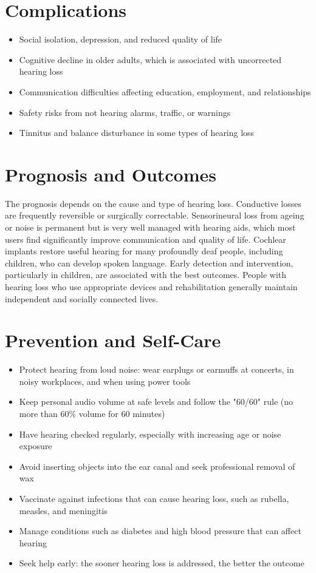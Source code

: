 \section*{Complications}
\begin{itemize}
    \item Social isolation, depression, and reduced quality of life
    \item Cognitive decline in older adults, which is associated with uncorrected hearing loss
    \item Communication difficulties affecting education, employment, and relationships
    \item Safety risks from not hearing alarms, traffic, or warnings
    \item Tinnitus and balance disturbance in some types of hearing loss
\end{itemize}

\section*{Prognosis and Outcomes}
The prognosis depends on the cause and type of hearing loss. Conductive losses are frequently reversible or surgically correctable. Sensorineural loss from ageing or noise is permanent but is very well managed with hearing aids, which most users find significantly improve communication and quality of life. Cochlear implants restore useful hearing for many profoundly deaf people, including children, who can develop spoken language. Early detection and intervention, particularly in children, are associated with the best outcomes. People with hearing loss who use appropriate devices and rehabilitation generally maintain independent and socially connected lives.

\section*{Prevention and Self-Care}
\begin{itemize}
    \item Protect hearing from loud noise: wear earplugs or earmuffs at concerts, in noisy workplaces, and when using power tools
    \item Keep personal audio volume at safe levels and follow the "60/60" rule (no more than 60\% volume for 60 minutes)
    \item Have hearing checked regularly, especially with increasing age or noise exposure
    \item Avoid inserting objects into the ear canal and seek professional removal of wax
    \item Vaccinate against infections that can cause hearing loss, such as rubella, measles, and meningitis
    \item Manage conditions such as diabetes and high blood pressure that can affect hearing
    \item Seek help early: the sooner hearing loss is addressed, the better the outcome
\end{itemize}

